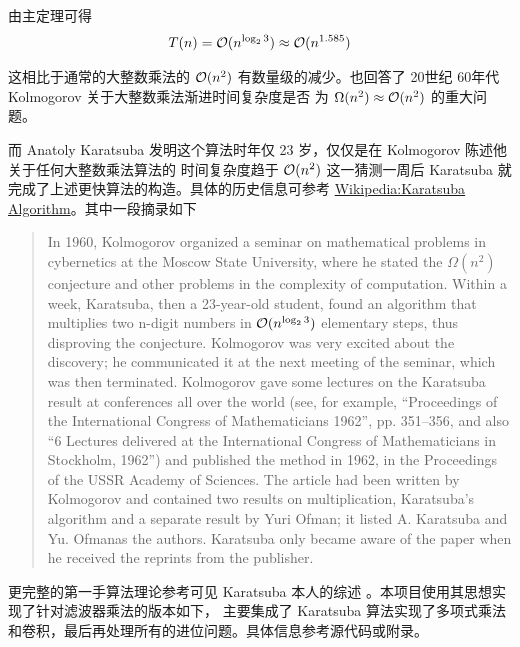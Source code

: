 由主定理可得 
\begin{eqnarray*}
    T(n) = \mathcal{O} (n^{\log_2 3}) \approx \mathcal{O} (n^{1.585})
\end{eqnarray*}

这相比于通常的大整数乘法的 $\mathcal{O} (n^2)$ 有数量级的减少。也回答了 20世纪 60年代 Kolmogorov 关于大整数乘法渐进时间复杂度是否
为 $\Omega(n^2) \approx \mathcal{O} (n^2)$ 的重大问题。

而 Anatoly Karatsuba 发明这个算法时年仅 23 岁，仅仅是在 Kolmogorov 陈述他关于任何大整数乘法算法的
时间复杂度趋于 $\mathcal{O}(n^2)$ 这一猜测一周后 Karatsuba 就完成了上述更快算法的构造。具体的历史信息可参考 
\href{https://en.wikipedia.org/wiki/Karatsuba_algorithm}{Wikipedia:Karatsuba Algorithm}。其中一段摘录如下

\begin{quote}
    In 1960, 
    Kolmogorov organized a seminar on mathematical problems in cybernetics 
    at the Moscow State University, where he stated the $\Omega (n^2)$ conjecture and other problems 
    in the complexity of computation. Within a week, Karatsuba, then a 23-year-old student, found an
     algorithm that multiplies two n-digit numbers in $\mathcal{O} (n^{\log_2 3})$ elementary steps, thus 
    disproving the conjecture. Kolmogorov was very excited about the discovery; 
    he communicated it at the next meeting of the seminar, which was then terminated. 
    Kolmogorov gave some lectures on the Karatsuba result at conferences all over the world 
    (see, for example, ``Proceedings of the International Congress of Mathematicians 1962'', 
    pp. 351–356, and also ``6 Lectures delivered at the International Congress of Mathematicians 
    in Stockholm, 1962'') and published the method in 1962, in the Proceedings of the USSR Academy 
    of Sciences. The article had been written by Kolmogorov and contained two results on 
    multiplication, Karatsuba's algorithm and a separate result by Yuri Ofman; it listed 
    \textquotedbl A. Karatsuba and Yu. Ofman\textquotedbl as the authors. Karatsuba only became aware of the paper 
    when he received the reprints from the publisher.
\end{quote}

更完整的第一手算法理论参考可见 Karatsuba 本人的综述 \cite{Karatsuba1995}。本项目使用其思想实现了针对滤波器乘法的版本如下，
主要集成了 Karatsuba 算法实现了多项式乘法和卷积，最后再处理所有的进位问题。具体信息参考源代码或附录。

\subsection{}

